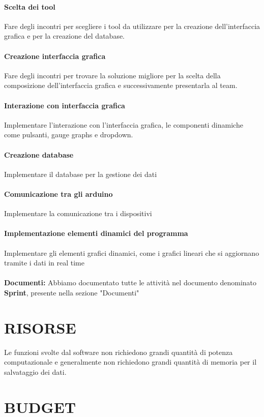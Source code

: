 \documentclass{report}
\begin{document}
\subsubsection{Scelta dei tool}
Fare degli incontri per scegliere i tool da utilizzare per la creazione dell'interfaccia grafica e per la creazione del database.
\subsubsection{Creazione interfaccia grafica}
Fare degli incontri per trovare la soluzione migliore per la scelta della composizione dell'interfaccia grafica e successivamente presentarla al team.
\subsubsection{Interazione con interfaccia grafica}
Implementare l'interazione con l'interfaccia grafica, le componenti dinamiche come pulsanti, gauge graphs e dropdown.
\subsubsection{Creazione database}
Implementare il database per la gestione dei dati
\subsubsection{Comunicazione tra gli arduino}
Implementare la comunicazione tra i dispositivi 
\subsubsection{Implementazione elementi dinamici del programma}
Implementare gli elementi grafici dinamici, come i grafici lineari che si aggiornano tramite i dati in real time\\\\
\textbf{Documenti:} Abbiamo documentato tutte le attività nel documento denominato \textbf{Sprint}, presente nella sezione "Documenti" 

\chapter{RISORSE}
Le funzioni svolte dal software non richiedono grandi quantità di potenza computazionale e generalmente non richiedono grandi quantità di memoria per il salvataggio dei dati.\\

\begingroup
\let\clearpage\relax
\chapter{BUDGET}
\endgroup
\end{document}
